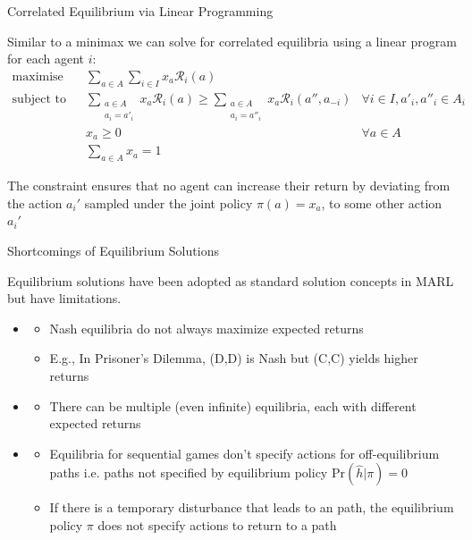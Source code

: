 \begin{frame}{Correlated Equilibrium via Linear Programming}

Similar to a minimax we can solve for correlated equilibria using a linear program for each agent \(i\):
\vspace{2pt}
\begin{align*}
\text{maximise} \quad & \sum_{a \in A} \sum_{i \in I} x_a \mathcal{R}_i(a) \\
\text{subject to} \quad & \sum_{\substack{a \in A \\ a_i=a'_i}} x_a \mathcal{R}_i(a) \geq \sum_{\substack{a \in A \\ a_i=a''_i}} x_a \mathcal{R}_i(a'', a_{-i}) & \forall i \in I, a'_i, a''_i \in A_i \\
& x_a \geq 0 & \forall a \in A \\
& \sum_{a \in A} x_a = 1
\end{align*}

\blist
    \item The constraint ensures that no agent can increase their return by deviating from the action \(a_{i}'\) sampled under the joint policy \(\pi(a) = x_a\), to some other action \(a_{i}'\)
\elist
\end{frame}

\begin{frame}{Shortcomings of Equilibrium Solutions}

Equilibrium solutions have been adopted as standard solution concepts in MARL but have limitations.
    
  \begin{itemize}
    \item<2-> 
      \begin{itemize}
        \item Nash equilibria do not always maximize expected returns
        \item E.g., In Prisoner’s Dilemma, (D,D) is Nash but (C,C) yields higher returns
      \end{itemize}
    \item<3-> 
      \begin{itemize}
        \item There can be multiple (even infinite) equilibria, each with different expected returns
      \end{itemize}
      \item<4-> 
      \begin{itemize}
        \item Equilibria for sequential games don't specify actions for off-equilibrium paths i.e. paths not specified by equilibrium policy \(\text{Pr}(\hat{h}|\pi) = 0\)
        \item If there is a temporary disturbance that leads to an  path, the equilibrium policy \(\pi\) does not specify actions to return to a  path
    \end{itemize}
  \end{itemize}
\end{frame}

